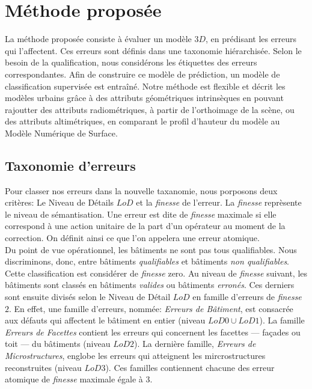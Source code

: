 \documentclass[a4paper,french]{article}
\begin{document}
    \section{Méthode proposée}

    La méthode proposée consiste à évaluer un modèle $3D$, en prédisant les erreurs qui l'affectent. Ces erreurs sont définis dans une taxonomie hiérarchisée. Selon le besoin de la qualification, nous considérons les étiquettes des erreurs correspondantes. Afin de construire ce modèle de prédiction, un modèle de classification supervisée est entraîné. Notre méthode est flexible et décrit les modèles urbains grâce à des attributs géométriques intrinsèques en pouvant rajoutter des attributs radiométriques, à partir de l'orthoimage de la scène, ou des attributs altimétriques, en comparant le profil d'hauteur du modèle au Modèle Numérique de Surface.

    \subsection{Taxonomie d'erreurs}

    Pour classer nos erreurs dans la nouvelle taxanomie, nous porposons deux critères: Le Niveau de Détails $LoD$ et la \emph{finesse} de l'erreur. La \emph{finesse} reprèsente le niveau de sémantisation. Une erreur est dite de \emph{finesse} maximale si elle correspond à une action unitaire de la part d'un opérateur au moment de la correction. On définit ainsi ce que l'on appelera une erreur atomique.\\

    Du point de vue opérationnel, les bâtiments ne sont pas tous qualifiables. Nous discriminons, donc, entre bâtiments \emph{qualifiables} et bâtiments \emph{non qualifiables}. Cette classification est considérer de \emph{finesse} zero. Au niveau de \emph{finesse} suivant, les bâtiments sont classés en bâtiments \emph{valides} ou bâtiments \emph{erronés}. Ces derniers sont ensuite divisés selon le Niveau de Détail $LoD$ en famille d'erreurs de \emph{finesse} $2$. En effet, une famille d'erreurs, nommée: \emph{Erreurs de Bâtiment}, est consacrée aux défauts qui affectent le bâtiment en entier (niveau $LoD 0\cup LoD 1$). La famille \emph{Erreurs de Facettes} contient les erreurs qui concernent les facettes --- façades ou toit --- du bâtiments (niveau $LoD 2$). La dernière famille, \emph{Erreurs de Microstructures}, englobe les erreurs qui atteignent les mircrostructures reconstruites (niveau $LoD 3$). Ces familles contiennent chacune des erreur atomique de \emph{finesse} maximale égale à $3$.
\end{document}
